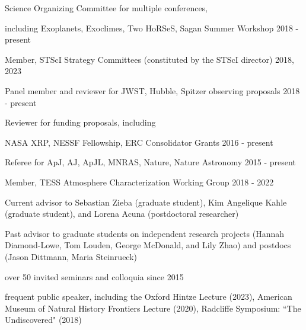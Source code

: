 \documentclass[12pt,letterpaper]{article}
\begin{document}

\begin{list}{}{\cvlist}
    \item Science Organizing Committee for multiple conferences, 
            \begin{sloppypar}
            including Exoplanets, Exoclimes, Two HoRSeS, Sagan Summer Workshop \hfill 2018 - present
            \end{sloppypar}
    \item Member, STScI Strategy Committees (constituted by the STScI director) \hfill 2018, 2023 
    \item Panel member and reviewer for JWST, Hubble, Spitzer observing proposals \hfill 2018 - present
    \item Reviewer for funding proposals, including
            \begin{sloppypar}
            NASA XRP, NESSF Fellowship, ERC Consolidator Grants \hfill 2016 - present
            \end{sloppypar}
    \item Referee for ApJ, AJ, ApJL, MNRAS, Nature, Nature Astronomy \hfill 2015 - present
    \item {Member, TESS Atmosphere Characterization Working Group \hfill 2018 - 2022}
\end{list}


\begin{list}{}{\cvlist}
\item Current advisor to Sebastian Zieba (graduate student), Kim Angelique Kahle (graduate student), and Lorena Acuna (postdoctoral researcher)
\item Past advisor to graduate students on independent research projects (Hannah Diamond-Lowe, Tom Louden, George McDonald, and Lily Zhao) and postdocs (Jason Dittmann, Maria Steinrueck)
\end{list}



\begin{list}{}{\cvlist}
\item over 50 invited seminars and colloquia since 2015 
\item frequent public speaker, including the
    Oxford Hintze Lecture (2023), American Museum of Natural History Frontiers Lecture (2020), Radcliffe Symposium: ``The Undiscovered" (2018)
\end{list}
\end{document}
